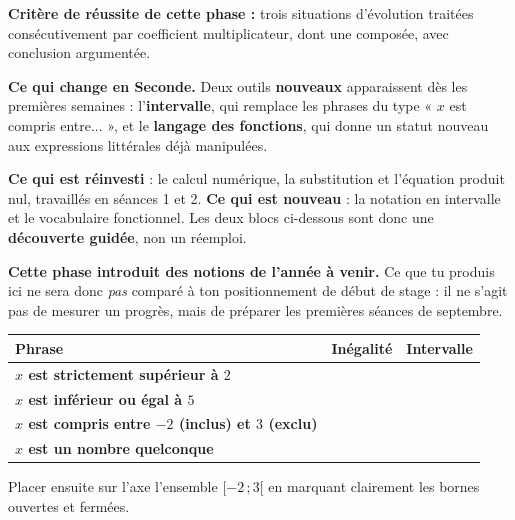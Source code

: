\documentclass[10pt,a4paper]{article}
\begin{document}
\begin{successbox}\textbf{Critère de réussite de cette phase :} trois situations d'évolution traitées consécutivement par coefficient multiplicateur, dont une composée, avec conclusion argumentée.\end{successbox}
\certline
\needspace{62mm}\par\vspace{3mm}

\begin{methodbox}
\textbf{Ce qui change en Seconde.} Deux outils \textbf{nouveaux} apparaissent dès les premières semaines :
l'\textbf{intervalle}, qui remplace les phrases du type « $x$ est compris entre... », et le \textbf{langage
des fonctions}, qui donne un statut nouveau aux expressions littérales déjà manipulées.
\par\smallskip
\textbf{Ce qui est réinvesti} : le calcul numérique, la substitution et l'équation produit nul, travaillés
en séances 1 et 2. \textbf{Ce qui est nouveau} : la notation en intervalle et le vocabulaire fonctionnel.
Les deux blocs ci-dessous sont donc une \textbf{découverte guidée}, non un réemploi.
\end{methodbox}
\begin{warningbox}\small
\textbf{Cette phase introduit des notions de l'année à venir.} Ce que tu produis ici ne sera donc
\emph{pas} comparé à ton positionnement de début de stage : il ne s'agit pas de mesurer un progrès,
mais de préparer les premières séances de septembre.
\end{warningbox}


\par\noindent\begin{tabularx}{\linewidth}{>{\bfseries}p{40mm} X X}
\toprule
Phrase & Inégalité & Intervalle \\
\midrule
$x$ est strictement supérieur à $2$ & & \\
$x$ est inférieur ou égal à $5$ & & \\
$x$ est compris entre $-2$ (inclus) et $3$ (exclu) & & \\
$x$ est un nombre quelconque & & \\
\bottomrule
\end{tabularx}
\par\vspace{1.5mm}
Placer ensuite sur l'axe l'ensemble $[-2\,;3[$ en marquant clairement les bornes ouvertes et fermées.
\begin{center}
\end{center}
\end{document}
